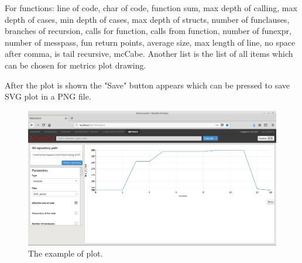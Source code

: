 For functions: line of code, char of code, function sum, max depth of calling, max depth of cases, min depth of cases, max depth of structs, number of funclauses, branches of recursion, calls for function, calls from function, number of funexpr, number of messpass, fun return points, average size, max length of line, no space after comma, is tail recursive, mcCabe. Another list is the list of all items which can be chosen for metrics plot drawing. 

After the plot is shown the "Save" button appears which can be pressed to save SVG plot in a PNG file. 

\begin{figure}[ht]
	\includegraphics[width=\textwidth]{figures/plot.png}
	\caption{The example of plot.}
	\label{fig:metrics_plot}
\end{figure}